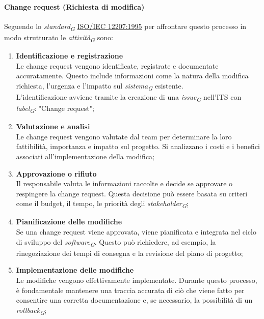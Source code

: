 \paragraph{Change request (Richiesta di modifica)}
Seguendo lo \textit{standard}\textsubscript{\textit{G}} \href{https://www.math.unipd.it/~tullio/IS-1/2009/Approfondimenti/ISO_12207-1995.pdf}{ISO/IEC 12207:1995} per affrontare questo processo in modo strutturato le \textit{attività}\textsubscript{\textit{G}} sono:
\begin{enumerate}
    \item \textbf{Identificazione e registrazione} \\
    Le change request vengono identificate, registrate e documentate accuratamente. Questo include informazioni come la natura della modifica richiesta, l'urgenza e l'impatto sul \textit{sistema}\textsubscript{\textit{G}} esistente. \\
    L'identificazione avviene tramite la creazione di una \textit{issue}\textsubscript{\textit{G}} nell'ITS con \textit{label}\textsubscript{\textit{G}}: "Change request";
    \item \textbf{Valutazione e analisi} \\
    Le change request vengono valutate dal team per determinare la loro fattibilità, importanza e impatto sul progetto. Si analizzano i costi e i benefici associati all'implementazione della modifica;
    \item \textbf{Approvazione o rifiuto} \\
    Il responsabile valuta le informazioni raccolte e decide se approvare o respingere la change request. Questa decisione può essere basata su criteri come il budget, il tempo, le priorità degli \textit{stakeholder}\textsubscript{\textit{G}};
    \item \textbf{Pianificazione delle modifiche} \\
    Se una change request viene approvata, viene pianificata e integrata nel ciclo di sviluppo del \textit{software}\textsubscript{\textit{G}}. Questo può richiedere, ad esempio, la rinegoziazione dei tempi di consegna e la revisione del piano di progetto;
    \item \textbf{Implementazione delle modifiche} \\
    Le modifiche vengono effettivamente implementate. Durante questo processo, è fondamentale mantenere una traccia accurata di ciò che viene fatto per consentire una corretta documentazione e, se necessario, la possibilità di un \textit{rollback}\textsubscript{\textit{G}};

\end{enumerate}
